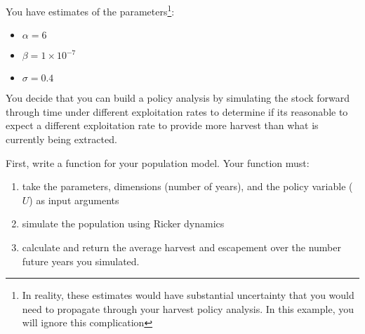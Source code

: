 \documentclass[]{book}
\providecommand{\tightlist}{%
  \setlength{\itemsep}{0pt}\setlength{\parskip}{0pt}}
\let\rmarkdownfootnote\footnote%
\def\footnote{\protect\rmarkdownfootnote}
\theoremstyle{definition}
\theoremstyle{definition}
\theoremstyle{definition}
\theoremstyle{remark}
\begin{document}
You have estimates of the parameters\footnote{In reality, these
  estimates would have substantial uncertainty that you would need to
  propagate through your harvest policy analysis. In this example, you
  will ignore this complication}:

\begin{itemize}
\tightlist
\item
  \(\alpha = 6\)
\item
  \(\beta = 1 \times 10^{-7}\)
\item
  \(\sigma = 0.4\)
\end{itemize}

You decide that you can build a policy analysis by simulating the stock
forward through time under different exploitation rates to determine if
its reasonable to expect a different exploitation rate to provide more
harvest than what is currently being extracted.

First, write a function for your population model. Your function must:

\begin{enumerate}
\def\labelenumi{\arabic{enumi}.}
\tightlist
\item
  take the parameters, dimensions (number of years), and the policy
  variable (\(U\)) as input arguments
\item
  simulate the population using Ricker dynamics
\item
  calculate and return the average harvest and escapement over the
  number future years you simulated.
\end{enumerate}
\end{document}
